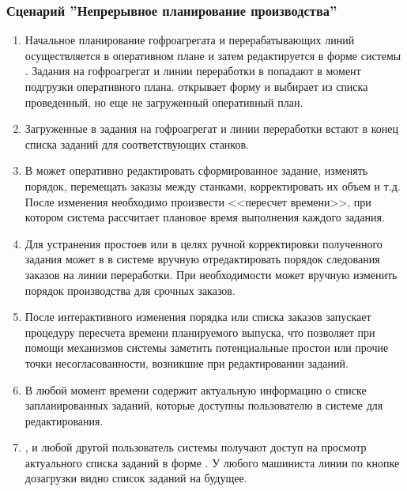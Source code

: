 
\subsubsection{Сценарий ''Непрерывное планирование производства''}
\label{bp:plan_4}

\begin{enumerate}


\item Начальное планирование гофроагрегата и перерабатывающих линий осуществляется в оперативном плане и затем редактируется в форме  системы \gofro. Задания на гофроагрегат и линии переработки в  попадают в момент подгрузки  \planner оперативного плана. \planner открывает форму  и выбирает из списка проведенный, но еще не загруженный оперативный план.
\item	Загруженные в  задания на гофроагрегат и линии переработки встают в конец списка заданий для соответствующих станков.
\item	В  \planner может оперативно редактировать сформированное задание, изменять порядок, перемещать заказы между станками, корректировать их объем и т.д. После изменения необходимо произвести <<пересчет времени>>, при котором система рассчитает плановое время выполнения каждого задания.
\item	Для устранения простоев или в целях ручной корректировки полученного задания \planner  может в  в системе \gofro вручную отредактировать порядок следования заказов на линии переработки. При необходимости \planner может вручную изменить порядок производства для срочных заказов.
\item	После интерактивного изменения порядка или списка заказов \planner запускает процедуру пересчета времени планируемого выпуска, что позволяет при помощи механизмов системы  \gofro заметить потенциальные простои или прочие точки несогласованности, возникшие при редактировании заданий.
\item	В любой момент времени  содержит актуальную информацию о списке запланированных заданий, которые доступны пользователю \planner в системе \gofro для редактирования.
\item	\master, \manager и любой другой пользователь системы \gofro получают доступ на просмотр актуального списка заданий в форме . У любого машиниста линии по кнопке дозагрузки видно список заданий на будущее.

\end{enumerate}
